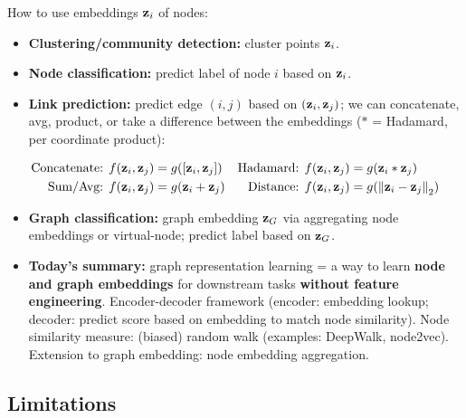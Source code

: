 How to use embeddings $\mathbf{z}_i$ of nodes:
\begin{itemize}
  \item \textbf{Clustering/community detection:} cluster points $\mathbf{z}_i$.
  \item \textbf{Node classification:} predict label of node $i$ based on $\mathbf{z}_i$.
  \item \textbf{Link prediction:} predict edge $(i,j)$ based on $(\mathbf{z}_i,\mathbf{z}_j)$;
    we can concatenate, avg, product, or take a difference between the
    embeddings ($*$ = Hadamard, per coordinate product):
\end{itemize}
\begin{align}
  \text{Concatenate: }& f(\mathbf{z}_i,\mathbf{z}_j)=g([\mathbf{z}_i,\mathbf{z}_j]) &
  \text{Hadamard: }& f(\mathbf{z}_i,\mathbf{z}_j)=g(\mathbf{z}_i*\mathbf{z}_j)\notag\\
  \text{Sum/Avg: }& f(\mathbf{z}_i,\mathbf{z}_j)=g(\mathbf{z}_i+\mathbf{z}_j) &
  \text{Distance: }& f(\mathbf{z}_i,\mathbf{z}_j)=g(\left\lVert \mathbf{z}_i-\mathbf{z}_j \right\rVert_2)\label{eq:lec02-linkpred}
\end{align}
\begin{itemize}
  \item \textbf{Graph classification:} graph embedding $\mathbf{z}_G$ via aggregating
    node embeddings or virtual-node; predict label based on $\mathbf{z}_G$.
  \item \textbf{Today's summary:} graph representation learning = a way to learn
    \textbf{node and graph embeddings} for downstream tasks \textbf{without
    feature engineering}. Encoder-decoder framework (encoder: embedding lookup;
    decoder: predict score based on embedding to match node similarity). Node
    similarity measure: (biased) random walk (examples: DeepWalk, node2vec).
    Extension to graph embedding: node embedding aggregation.
\end{itemize}

\subsection{Limitations}\label{sec:lec02-limitations}

